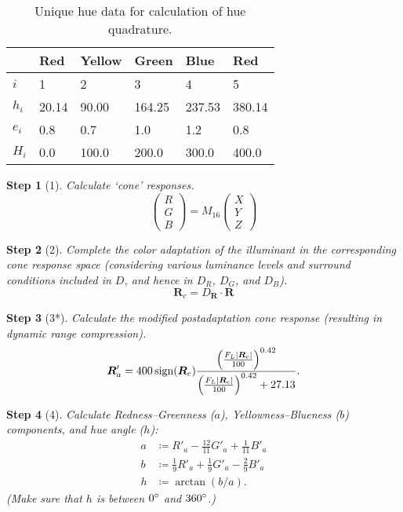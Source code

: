 \documentclass[twocolumn]{scrartcl}
\theoremstyle{named}
\newtheorem*{step}{Step}
\DeclarePairedDelimiter\abs{\lvert}{\rvert}%
\DeclareMathOperator{\sign}{sign}
\newcommand\rgb{\bm{R}}
\begin{document}
\begin{table}\centering
  \begin{tabularx}{\linewidth}{XXXXXX}
  \toprule
        & Red   & Yellow & Green & Blue   & Red\\
  \midrule
  $i$   & 1     & 2     & 3      & 4      & 5\\
  $h_i$ & 20.14 & 90.00 & 164.25 & 237.53 & 380.14\\
  $e_i$ & 0.8   & 0.7   & 1.0    & 1.2    & 0.8\\
  $H_i$ & 0.0   & 100.0 & 200.0  & 300.0  & 400.0\\
  \bottomrule
\end{tabularx}
  \caption{Unique hue data for calculation of hue quadrature.}\label{table:hue}
\end{table}

\begin{step}[1]
Calculate `cone' responses.
\[
\begin{pmatrix}R\\G\\B\end{pmatrix}
= M_{16} \begin{pmatrix}X\\Y\\Z\end{pmatrix}
\]
\end{step}

\begin{step}[2]
Complete the color adaptation of the illuminant in
the corresponding cone response space (considering various
luminance levels and surround conditions included in $D$, and
hence in $D_R$, $D_G$, and $D_B$).
\[
  \rgb_c = D_{\rgb} \cdot \rgb
\]
\end{step}

\begin{step}[3*]
Calculate the modified postadaptation cone response
(resulting in dynamic range compression).
\[
  \rgb'_a = 400 \sign(\rgb_c)
    \frac
    {{\left(\frac{F_L \abs{\rgb_c}}{100}\right)}^{0.42}}
    {{\left(\frac{F_L \abs{\rgb_c}}{100}\right)}^{0.42} + 27.13}.
\]
\end{step}

\begin{step}[4]
Calculate Redness--Greenness ($a$), Yellowness--Blueness ($b$) components,
and hue angle ($h$):
\begin{align*}
  a&\coloneqq R'_a - \tfrac{12}{11} G'_a + \tfrac{1}{11} B'_a\\
  b&\coloneqq \tfrac{1}{9} R'_a + \tfrac{1}{9} G'_a - \tfrac{2}{9} B'_a\\
  h&\coloneqq \arctan(b/a).
\end{align*}
(Make sure that $h$ is between $0\degree$ and $360\degree$.)
\end{step}
\end{document}
